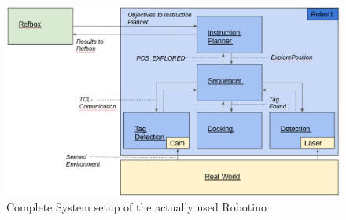 \begin{figure}[h]
\centering
\includegraphics[scale=0.23]{pic/struckture_wRefbo.png}
\caption{Complete System setup of the actually used Robotino}
\label{fig:struct_wRefBox}
\end{figure}
